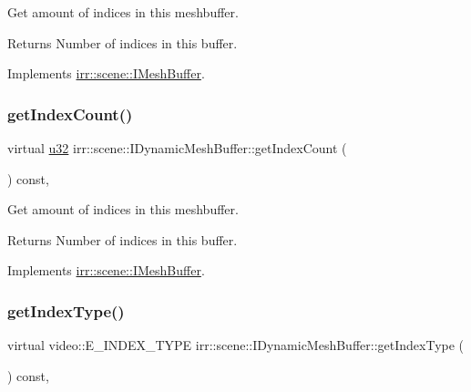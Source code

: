 Get amount of indices in this meshbuffer. 

\begin{DoxyReturn}{Returns}
Number of indices in this buffer. 
\end{DoxyReturn}


Implements \hyperlink{classirr_1_1scene_1_1IMeshBuffer_a96e08662e15b1205516b87ada3301551}{irr\+::scene\+::\+I\+Mesh\+Buffer}.

\mbox{\label{classirr_1_1scene_1_1IDynamicMeshBuffer_adc483bdd7dfac4eb54e25c763ae1dae0}} 
\subsubsection{\texorpdfstring{get\+Index\+Count()}{getIndexCount()}\hspace{0.1cm}{\footnotesize\ttfamily [2/2]}}
{\footnotesize\ttfamily virtual \hyperlink{namespaceirr_a0416a53257075833e7002efd0a18e804}{u32} irr\+::scene\+::\+I\+Dynamic\+Mesh\+Buffer\+::get\+Index\+Count (\begin{DoxyParamCaption}{ }\end{DoxyParamCaption}) const\hspace{0.3cm}{\ttfamily [inline]}, {\ttfamily [virtual]}}



Get amount of indices in this meshbuffer. 

\begin{DoxyReturn}{Returns}
Number of indices in this buffer. 
\end{DoxyReturn}


Implements \hyperlink{classirr_1_1scene_1_1IMeshBuffer_a96e08662e15b1205516b87ada3301551}{irr\+::scene\+::\+I\+Mesh\+Buffer}.

\mbox{\label{classirr_1_1scene_1_1IDynamicMeshBuffer_a3ac73aed8c40103682c5c6388339e70d}} 
\subsubsection{\texorpdfstring{get\+Index\+Type()}{getIndexType()}\hspace{0.1cm}{\footnotesize\ttfamily [1/2]}}
{\footnotesize\ttfamily virtual video\+::\+E\+\_\+\+I\+N\+D\+E\+X\+\_\+\+T\+Y\+PE irr\+::scene\+::\+I\+Dynamic\+Mesh\+Buffer\+::get\+Index\+Type (\begin{DoxyParamCaption}{ }\end{DoxyParamCaption}) const\hspace{0.3cm}{\ttfamily [inline]}, {\ttfamily [virtual]}}



